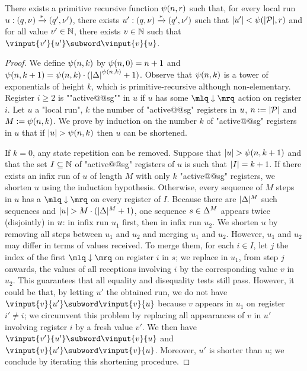 \begin{lemma}
\label{lem:towerbound_signature}
There exists a primitive recursive function $\psi(n,r)$ such that, for every local run $u: (q,\nu) \xrightarrow{*} (q', \nu')$, there exists $u' : (q,\nu) \xrightarrow{*} (q',\nu')$ such that $|u'| < \psi(|\mathcal{P}|,r)$ and for all value $v' \in \mathbb{N}$, there exists $v \in \mathbb{N}$ such that  $\vinput{v'}{u'} \subword \vinput{v}{u}$. 
\end{lemma}
\begin{proof}
We define $\psi(n,k)$ by $\psi(n,0) = n+1$ and $\psi(n,k+1) = \psi(n,k) \cdot ({|\Delta|}^{\psi(n,k)}+1)$. Observe that $\psi(n,k)$ is a tower of exponentials of height $k$, which is primitive-recursive although non-elementary. Register $i \geq 2$ is ""active@@sg"" in $u$ if $u$ has some $\quotemarks{\enregact}$ action on register $i$. Let $u$ a "local run", $k$ the number of "active@@sg" registers in $u$, $n := |\mathcal{P}|$ and $M := \psi(n,k)$.
We prove by induction on the number $k$ of "active@@sg" registers in $u$  that if $|u| >\psi(n,k)$ then $u$ can be shortened. 
 

If $k=0$, any state repetition can be removed. Suppose that $|u| > \psi(n,k+1)$ and that the set $I \subseteq \mathbb{N}$ of "active@@sg" registers of $u$ is such that $|I| = k+1$. If there exists an infix run of $u$ of length $M$ with only $k$ "active@@sg" registers, we shorten $u$ using the induction hypothesis. Otherwise, every sequence of $M$ steps in $u$ has a $\quotemarks{\enregact}$ on every register of $I$. Because there are $|\Delta|^M$ such sequences and $|u| > M \cdot (|\Delta|^M +1)$, one sequence $s \in \Delta^M$ appears twice (disjointly) in $u$: in infix run $u_1$ first, then in infix run $u_2$. We shorten $u$ by removing all steps between $u_1$ and $u_2$ and merging $u_1$ and $u_2$. However, $u_1$ and $u_2$ may differ in terms of values received. To merge them, for each $i \in I$, let $j$ the index of the first $\quotemarks{\enregact}$ on register $i$ in $s$; we replace in $u_1$, from step $j$ onwards, the values of all receptions involving $i$ by the corresponding value $v$ in $u_2$. 
 This guarantees that all equality and disequality tests still pass. However, it could be that, by letting $u'$ the obtained run, we do not have $\vinput{v}{u'} \subword \vinput{v}{u}$ because $v$ appears in $u_1$ on register $i' \ne i$; we circumvent this problem by replacing all appearances of $v$ in $u'$ involving register $i$ by a fresh value $v'$. We then have $\vinput{v'}{u'} \subword \vinput{v}{u}$ and $\vinput{v}{u'} \subword \vinput{v}{u}$. Moreover, $u'$ is shorter than $u$; we conclude by iterating this shortening procedure.
\end{proof}

